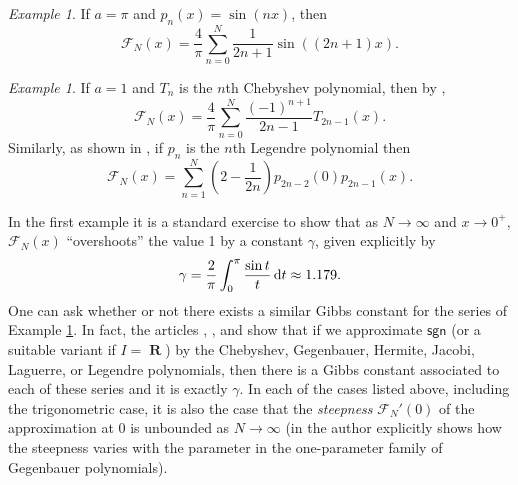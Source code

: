 \documentclass{amsart}
\newcommand{\R}{\operatorname{\mathbf{R}}}
\newcommand{\sgn}{\mathsf{sgn}}
\theoremstyle{plain}
\theoremstyle{remark}
\newtheorem{exm}[equation]{Example}
\begin{document}
\begin{exm} \label{trig_gibbs}
If $a = \pi$ and $p_n(x) = \sin(nx)$, then 
\[
\mathcal{F}_N(x) = \frac{4}{\pi} \sum_{n=0}^N \frac{1}{2n+1} \sin((2n+1)x).
\]
\end{exm}

\begin{exm} \label{legendre_gibbs}
If $a=1$ and $T_n$ is the $n$th Chebyshev polynomial, then by \cite[Equation (3.10)]{fay},
\[
\mathcal{F}_N(x) = \frac{4}{\pi} \sum_{n=0}^N \frac{(-1)^{n+1}}{2n-1}T_{2n-1}(x).
\]
Similarly, as shown in \cite[Equation (6.14)]{fay}, if $p_n$ is the $n$th Legendre polynomial then
\[
\mathcal{F}_N(x) = \sum_{n=1}^N \left(2-\frac{1}{2n} \right)p_{2n-2}(0)p_{2n-1}(x).
\]
\end{exm}

In the first example it is a standard exercise to show that as $N \to \infty$ and $x \to 0^+$, $\mathcal{F}_N(x)$ ``overshoots'' the value 1 by a constant $\gamma$, given explicitly by
\[
\gamma = \frac{2}{\pi} \int_0^\pi \frac{\sin t}{t} \,{\rm d}t \approx 1.179.
\]
One can ask whether or not there exists a similar Gibbs constant for the series of Example \ref{legendre_gibbs}.  In fact, the articles \cite{cs}, \cite{dh}, and \cite{kaber} show that if we approximate $\sgn$ (or a suitable variant if $I = \R$) by the Chebyshev, Gegenbauer, Hermite, Jacobi, Laguerre, or Legendre polynomials, then there is a Gibbs constant associated to each of these series and it is exactly $\gamma$. In each of the cases listed above, including the trigonometric case, it is also the case that the \emph{steepness} $\mathcal{F}_N'(0)$ of the approximation at 0 is unbounded as $N \to \infty$ (in \cite[\S3.2]{kaber} the author explicitly shows how the steepness varies with the parameter in the one-parameter family of Gegenbauer polynomials).
\end{document}
